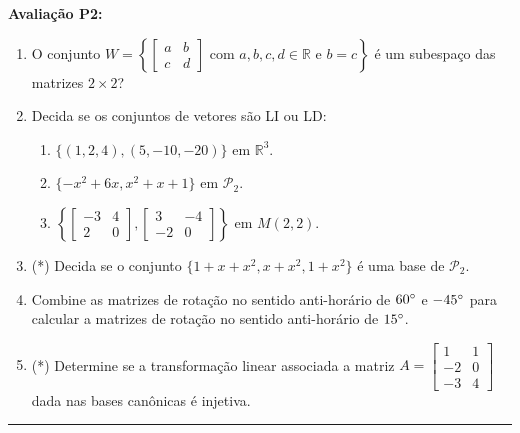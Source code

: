 \documentclass{article}
\begin{document}
{\bf Avalia\c{c}\~ao P2:}
\begin{enumerate}
\item O conjunto
	$W = \left\{
		\left[\begin{array}{cc}
			a & b \\
			c & d
		\end{array}\right] \mbox{ com }
	a, b, c, d \in \mathbb{R} \mbox{ e } b = c\right\}$
\'e um subespa\c{c}o das matrizes $2\times 2$?

\item Decida se os conjuntos de vetores s\~ao LI ou LD:
	\begin{enumerate}
		\item $\{(1, 2, 4), (5, -10, -20)\}$ em $\mathbb{R}^3$.
		\item $\{-x^2+6x, x^2+x+1\}$ em $\mathcal{P}_2$.
		\item $\left\{
			\left[\begin{array}{cc}
				-3 & 4 \\
				2 & 0
			\end{array}\right], 
			\left[\begin{array}{cc}
				3 & -4 \\
				-2 & 0
			\end{array}\right]\right\}$
		em $M(2, 2)$.
	\end{enumerate}

\item (*) Decida se o conjunto $\{1+x+x^2, x+x^2, 1+x^2\}$ \'e uma base de $\mathcal{P}_2$.

\item Combine as matrizes de rota\c{c}\~ao no sentido anti-hor\'ario de $60\degree$ e $-45\degree$ para
	calcular a matrizes de rota\c{c}\~ao no sentido anti-hor\'ario de $15\degree$.

\item (*) Determine se a transforma\c{c}\~ao linear associada a matriz
	$A=\left[\begin{array}{cc}
			1 & 1 \\
			-2 & 0 \\
			-3 & 4
		\end{array}\right]$
	dada nas bases can\^onicas \'e injetiva.
\end{enumerate}

\noindent{}\rule{\textwidth}{0.4pt}
\end{document}
